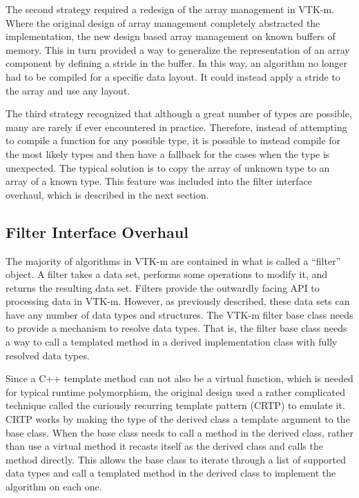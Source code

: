 The second strategy required a redesign of the array management in VTK-m.
Where the original design of array management completely abstracted the implementation, the new design based array management on known buffers of memory.
This in turn provided a way to generalize the representation of an array component by defining a stride in the buffer.
In this way, an algorithm no longer had to be compiled for a specific data layout.
It could instead apply a stride to the array and use any layout.

The third strategy recognized that although a great number of types are possible, many are rarely if ever encountered in practice.
Therefore, instead of attempting to compile a function for any possible type, it is possible to instead compile for the most likely types and then have a fallback for the cases when the type is unexpected.
The typical solution is to copy the array of unknown type to an array of a known type.
This feature was included into the filter interface overhaul, which is described in the next section.

\subsection{Filter Interface Overhaul}


The majority of algorithms in VTK-m are contained in what is called a ``filter'' object.
A filter takes a data set, performs some operations to modify it, and returns the resulting data set.
Filters provide the outwardly facing API to processing data in VTK-m.
However, as previously described, these data sets can have any number of data types and structures.
The VTK-m filter base class needs to provide a mechanism to resolve data types.
That is, the filter base class needs a way to call a templated method in a derived implementation class with fully resolved data types.

Since a C++ template method can not also be a virtual function, which is needed for typical runtime polymorphism, the original design used a rather complicated technique called the curiously recurring template pattern (CRTP) \cite{Coplien1995} to emulate it.
CRTP works by making the type of the derived class a template argument to the base class.
When the base class needs to call a method in the derived class, rather than use a virtual method it recasts itself as the derived class and calls the method directly.
This allows the base class to iterate through a list of supported data types and call a templated method in the derived class to implement the algorithm on each one.

